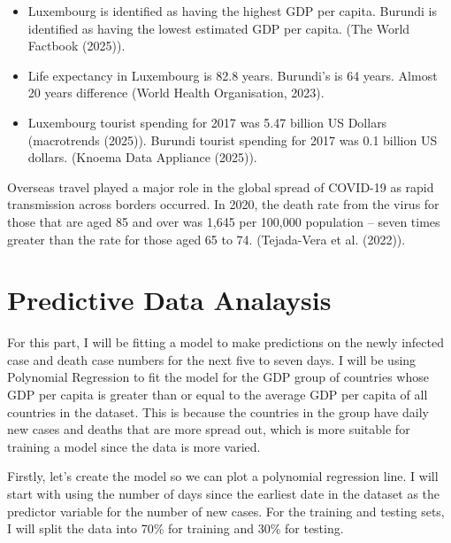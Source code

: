 \documentclass[
]{article}
\providecommand{\tightlist}{%
  \setlength{\itemsep}{0pt}\setlength{\parskip}{0pt}}
\begin{document}
\begin{itemize}
\tightlist
\item
  Luxembourg is identified as having the highest GDP per capita. Burundi
  is identified as having the lowest estimated GDP per capita. (The
  World Factbook (2025)).\newline
\item
  Life expectancy in Luxembourg is 82.8 years. Burundi's is 64 years.
  Almost 20 years difference (World Health Organisation, 2023).\newline
\item
  Luxembourg tourist spending for 2017 was 5.47 billion US Dollars
  (macrotrends (2025)). Burundi tourist spending for 2017 was 0.1
  billion US dollars. (Knoema Data Appliance (2025)).
\end{itemize}

Overseas travel played a major role in the global spread of COVID-19 as
rapid transmission across borders occurred. In 2020, the death rate from
the virus for those that are aged 85 and over was 1,645 per 100,000
population -- seven times greater than the rate for those aged 65 to 74.
(Tejada-Vera et al. (2022)).

\section{Predictive Data Analaysis}\label{predictive-data-analaysis}

For this part, I will be fitting a model to make predictions on the
newly infected case and death case numbers for the next five to seven
days. I will be using Polynomial Regression to fit the model for the GDP
group of countries whose GDP per capita is greater than or equal to the
average GDP per capita of all countries in the dataset. This is because
the countries in the group have daily new cases and deaths that are more
spread out, which is more suitable for training a model since the data
is more varied.

Firstly, let's create the model so we can plot a polynomial regression
line. I will start with using the number of days since the earliest date
in the dataset as the predictor variable for the number of new cases.
For the training and testing sets, I will split the data into 70\% for
training and 30\% for testing.
\end{document}

